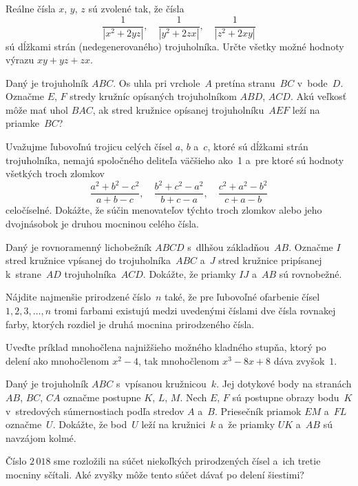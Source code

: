 {%
Reálne čísla $x$, $y$, $z$ sú zvolené tak, že čísla
$$
\frac{1}{|x^2+2yz|}, \quad \frac{1}{|y^2+2zx|}, \quad \frac{1}{|z^2+2xy|}
$$
sú dĺžkami strán (nedegenerovaného) trojuholníka. Určte všetky
možné hodnoty výrazu $xy+yz+zx$.}

{%
Daný je trojuholník $ABC$. Os uhla pri vrchole~$A$
pretína stranu~$BC$ v~bode~$D$. Označme $E$, $F$ stredy kružníc opísaných
trojuholníkom $ABD$, $ACD$. Akú veľkosť môže mať uhol $BAC$,
ak stred kružnice opísanej trojuholníku~$AEF$ leží na priamke~$BC$?}

{%
Uvažujme ľubovoľnú trojicu celých čísel
$a$, $b$ a~$c$,
ktoré sú dĺžkami strán trojuholníka, nemajú spoločného
deliteľa väčšieho ako~1 a~pre ktoré sú hodnoty všetkých troch
zlomkov
$$
\frac{a^2+b^2-c^2}{a+b-c},\quad
\frac{b^2+c^2-a^2}{b+c-a},\quad
\frac{c^2+a^2-b^2}{c+a-b}
$$
celočíselné. Dokážte, že súčin menovateľov týchto troch zlomkov
alebo jeho dvojnásobok je druhou mocninou celého čísla.}

{%
Daný je rovnoramenný lichobežník $ABCD$ s~dlhšou základňou~$AB$.
Označme $I$ stred kružnice vpísanej do trojuholníka~$ABC$ a~$J$
stred kružnice pripísanej k~strane~$AD$ trojuholníka~$ACD$. Dokážte, že
priamky $IJ$ a~$AB$ sú rovnobežné.}

{%
Nájdite najmenšie prirodzené číslo~$n$ také, že
pre ľubovoľné ofarbenie čísel $1, 2, 3, \dots, n$
tromi farbami existujú medzi uvedenými číslami dve čísla
rovnakej farby, ktorých rozdiel je druhá mocnina prirodzeného čísla.}

{%
Uveďte príklad mnohočlena najnižšieho možného kladného stupňa,
ktorý po delení ako mnohočlenom $x^2-4$, tak
mnohočlenom $x^3-8x+8$ dáva zvyšok~$1$.}

{%
Daný je trojuholník $ABC$ s~vpísanou kružnicou~$k$. Jej dotykové body
na stranách $AB$, $BC$, $CA$ označme postupne $K$, $L$,
$M$. Nech $E$, $F$ sú postupne obrazy bodu~$K$ v~stredových súmernostiach
podľa stredov $A$ a~$B$. Priesečník priamok $EM$ a~$FL$ označme~$U$.
Dokážte, že bod~$U$ leží na kružnici~$k$ a~že priamky $UK$ a~$AB$
sú navzájom kolmé.}

{%
Číslo $2\,018$ sme rozložili na súčet niekoľkých prirodzených čísel
a~ich tretie mocniny sčítali.
Aké zvyšky môže tento súčet dávať po delení šiestimi?}

